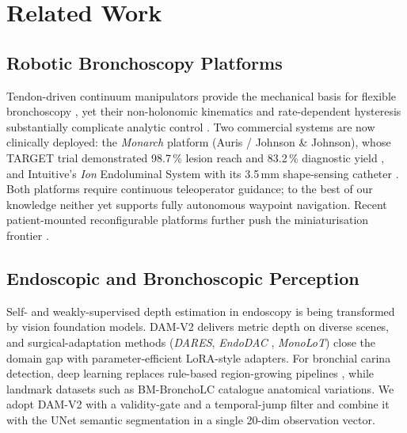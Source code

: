 \documentclass[journal,comsoc]{IEEEtran}
\begin{document}
\section{Related Work}
\label{sec:related}

\subsection{Robotic Bronchoscopy Platforms}
Tendon-driven continuum manipulators provide the mechanical basis for
flexible bronchoscopy \cite{camarillo2008mechanics,roesthuis2014continuum},
yet their non-holonomic kinematics and rate-dependent hysteresis
substantially complicate analytic control \cite{cho2024hysteresis}.
Two commercial systems are now clinically deployed: the \emph{Monarch}
platform (Auris / Johnson \& Johnson), whose TARGET trial
demonstrated 98.7\,\% lesion reach and 83.2\,\% diagnostic yield
\cite{target2025}, and Intuitive's \emph{Ion} Endoluminal System with
its 3.5\,mm shape-sensing catheter \cite{target2025}. Both platforms
require continuous teleoperator guidance; to the best of our knowledge
neither yet supports fully autonomous waypoint navigation.
Recent patient-mounted reconfigurable platforms further push the
miniaturisation frontier \cite{lawson2024assembled}.

\subsection{Endoscopic and Bronchoscopic Perception}
Self- and weakly-supervised depth estimation in endoscopy is being
transformed by vision foundation models. DAM-V2 \cite{yang2024depthv2}
delivers metric depth on diverse scenes, and surgical-adaptation
methods (\textit{DARES}\cite{dares2024}, \textit{EndoDAC}
\cite{endodac2024}, \textit{MonoLoT}\cite{monolot2024}) close the
domain gap with parameter-efficient LoRA-style adapters. For
bronchial carina detection, deep learning replaces rule-based
region-growing pipelines \cite{faia240657,naviairway2022}, while
landmark datasets such as BM-BronchoLC \cite{bm-broncholc2024}
catalogue anatomical variations. We adopt DAM-V2 with a
validity-gate and a temporal-jump filter and combine it with the
UNet semantic segmentation in a single 20-dim observation vector.
\end{document}
